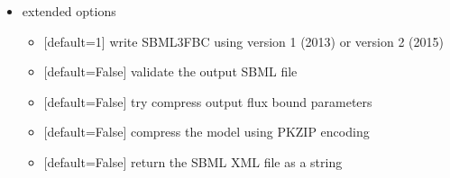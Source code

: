 \documentclass[letterpaper,10pt,english]{sphinxmanual}
\begin{document}
\begin{fulllineitems}
\begin{itemize}
\item {} 
\sphinxAtStartPar
{} extended options
\begin{itemize}
\item {} 
\sphinxAtStartPar
{} {[}default=1{]} write SBML3FBC using version 1 (2013) or version 2 (2015)

\item {} 
\sphinxAtStartPar
{} {[}default=False{]} validate the output SBML file

\item {} 
\sphinxAtStartPar
{} {[}default=False{]} try compress output flux bound parameters

\item {} 
\sphinxAtStartPar
{} {[}default=False{]} compress the model using PKZIP encoding

\item {} 
\sphinxAtStartPar
{} {[}default=False{]} return the SBML XML file as a string

\end{itemize}

\end{itemize}

\end{fulllineitems}

\end{document}
